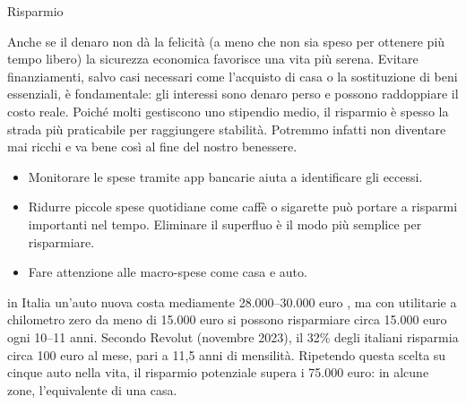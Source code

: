 \documentclass[12pt]{book} %
\begin{document}
\begin{mdframed}[linewidth=1pt]
Risparmio

Anche se il denaro non dà la felicità (a meno che non sia speso per ottenere più tempo libero) la sicurezza economica favorisce una vita più serena. Evitare finanziamenti, salvo casi necessari come l’acquisto di casa o la sostituzione di beni essenziali, è fondamentale: gli interessi sono denaro perso e possono raddoppiare il costo reale.
Poiché molti gestiscono uno stipendio medio, il risparmio è spesso la strada più praticabile per raggiungere stabilità.
Potremmo infatti non diventare mai ricchi e va bene così al fine del nostro benessere.
\begin{itemize}
\item Monitorare le spese tramite app bancarie aiuta a identificare gli eccessi. 
\item Ridurre piccole spese quotidiane come caffè o sigarette può portare a risparmi importanti nel tempo. Eliminare il superfluo è il modo più semplice per risparmiare.
\item Fare attenzione alle macro-spese come casa e auto.
\end{itemize}

in Italia un’auto nuova costa mediamente 28.000–30.000 euro   , ma con utilitarie a chilometro zero da meno di 15.000 euro si possono risparmiare circa 15.000 euro ogni 10–11 anni.
Secondo Revolut (novembre 2023), il 32\% degli italiani risparmia circa 100 euro al mese, pari a 11,5 anni di mensilità. Ripetendo questa scelta su cinque auto nella vita, il risparmio potenziale supera i 75.000 euro: in alcune zone, l’equivalente di una casa.


\end{mdframed}
\end{document}
